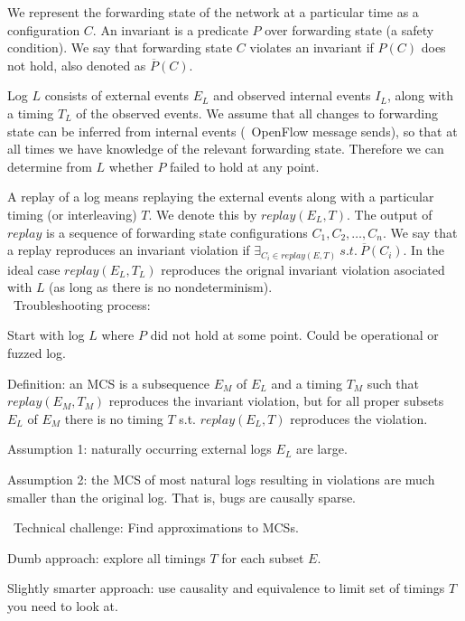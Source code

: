 We represent the forwarding state of the network
at a particular time as a configuration $C$.
An invariant is a predicate $P$ over forwarding state (a safety
condition). We say that forwarding
state $C$ violates an invariant if $P(C)$ does not
hold, also denoted as $\overline{P}(C)$.

Log $L$ consists of external events $E_L$ and observed internal events $I_L$,
along with a timing $T_L$ of the observed events.
We assume that all changes to forwarding state can be inferred
from internal events (\eg~OpenFlow message sends), so
that at all times we have knowledge of the relevant forwarding state.
Therefore we can determine from $L$ whether $P$ failed to hold at any point.

A replay of a log means replaying the external events along with a particular timing (or interleaving) $T$.
We denote this by $replay(E_L,T)$.
The output of $replay$ is a sequence of forwarding state configurations
$C_1,C_2,\dots,C_n$.
We say that a replay reproduces an invariant violation if
$\exists_{C_i \in replay(E,T)}\:s.t.\:\overline{P}(C_i)$.
In the ideal case $replay(E_L,T_L)$ reproduces the orignal invariant violation
asociated with $L$ (as long as there is no nondeterminism). \\

\noindent~Troubleshooting process:

\begin{outline}
\1 Start with log $L$ where $P$ did not hold at some point. Could be operational or fuzzed log.

\1 Definition: an MCS is a subsequence $E_M$ of $E_L$ and a timing $T_M$ such
that $replay(E_M,T_M)$ reproduces the invariant violation, but for all proper
subsets $E_L$ of $E_M$
there is no timing $T$ s.t. $replay(E_L,T)$ reproduces the violation.

\1 Assumption 1: naturally occurring external logs $E_L$ are large.

\1 Assumption 2: the MCS of most natural logs resulting in violations are much smaller than the original log.  That is, bugs are causally sparse.
\end{outline}

\noindent~Technical challenge: Find approximations to MCSs.

\begin{outline}
\1 Dumb approach: explore all timings $T$ for each subset $E$.

\1 Slightly smarter approach: use causality and equivalence to limit set of timings $T$ you need to look at.
\end{outline}
